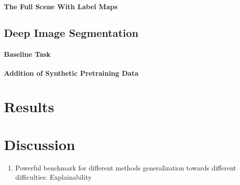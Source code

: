 \documentclass[12pt,fleqn]{article}
\begin{document}
\paragraph{The Full Scene With Label Maps}

\subsection{Deep Image Segmentation}
\paragraph{Baseline Task}
\paragraph{Addition of Synthetic Pretraining Data}

\section{Results}%
\label{sec:results}

\section{Discussion}%
\label{sec:disc}
\begin{enumerate}
    \item Powerful benchmark for different methods generalization towards different difficulties: Explainability
\end{enumerate}
\end{document}
